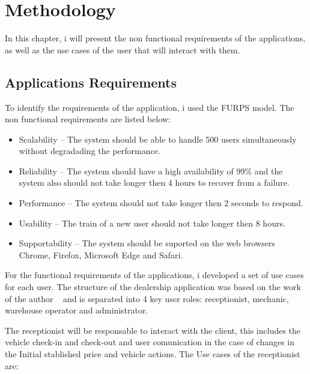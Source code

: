 \chapter{Methodology}%
\label{chapter:methodology}

\begin{introduction}
In this chapter, i will present the non functional requirements of the applications, as well as the use cases of the user that will interact with them. 
\end{introduction} 




\section{Applications Requirements} 


To identify the requirements of the application, i used the FURPS model. 
The non functional requirements are listed below:

\begin{itemize}
  \item Scalability – The system should be able to handle 500 users simultaneously without degradading the performance.
  \item Reliability – The system should have a high availability of 99\% and the system also should not take longer then 4 hours to recover from a failure.
  \item Performance – The system should not take longer then 2 seconds to respond.
  \item Usability – The train of a new user should not take longer then 8 hours.
  \item Supportability – The system should be suported on the web browsers Chrome, Firefox, Microsoft Edge and Safari.
\end{itemize}

For the functional requirements of the applications, i developed a set of use cases for each user.
The structure of the dealership application was based on the work of the author ~\citet{Setting_the_after_sale_process} and is separated into 4 key user roles: receptionist, mechanic, warehouse operator and administrator.

The receptionist will be responsable to interact with the client, this includes the vehicle check-in and check-out and user comunication in the case of changes in the Initial stablished price and vehicle actions. 
The Use cases of the receptionist are:

